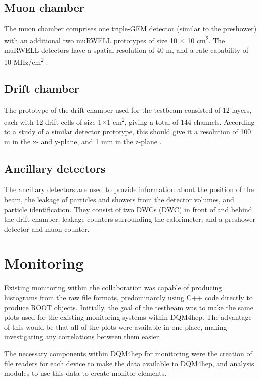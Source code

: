 \subsection{Muon chamber}
The muon chamber comprises one triple-GEM detector (similar to the preshower) with an additional two \acrshort{muRWELL} prototypes of size 10 $\times$ 10 cm\textsuperscript{2}. The \acrshort{muRWELL} detectors have a spatial resolution of 40 \textmu m, and a rate capability of 10 MHz/cm\textsuperscript{2} \cite{idea-micro-rwell}.

\subsection{Drift chamber}
The prototype of the drift chamber used for the testbeam consisted of 12 layers, each with 12 drift cells of size 1$\times$1 cm\textsuperscript{2}, giving a total of 144 channels. According to a study of a similar detector prototype, this should give it a resolution of 100 \textmu m in the x- and y-plane, and 1 mm in the z-plane \cite{idea-drift-chamber} .

\subsection{Ancillary detectors}
The ancillary detectors are used to provide information about the position of the beam, the leakage of particles and showers from the detector volumes, and particle identification. They consist of two \acrlong{DWC}s (\acrshort{DWC}) in front of and behind the drift chamber; leakage counters surrounding the calorimeter; and a preshower detector and muon counter.

\section{Monitoring}
Existing monitoring within the collaboration was capable of producing histograms from the raw file formats, predominantly using C++ code directly to produce ROOT objects. Initially, the goal of the testbeam was to make the same plots used for the existing monitoring systems within \acrshort{DQM4hep}. The advantage of this would be that all of the plots were available in one place, making investigating any correlations between them easier.

The necessary components within \acrshort{DQM4hep} for monitoring were the creation of file readers for each device to make the data available to \acrshort{DQM4hep}, and analysis modules to use this data to create monitor elements.

